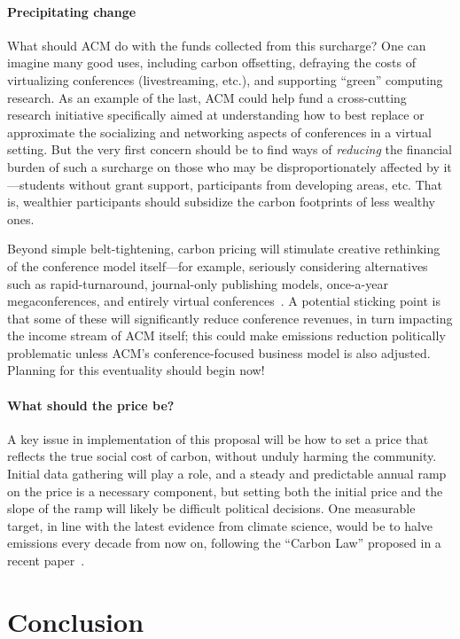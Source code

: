\documentclass[12pt]{article}
\newcommand{\bcp}[1]{\ifdraft{\bf [bcp: #1]}\fi}
\newcommand{\SECTION}{\section*}
\newcommand{\PARAGRAPH}{\paragraph*}
\begin{document}
\PARAGRAPH{Precipitating change}
What should ACM do with the funds collected from this surcharge?  One can
imagine many good uses, including carbon offsetting, defraying the costs of
virtualizing conferences (livestreaming, etc.), and supporting ``green''
computing research. As an example of the last, ACM could help fund a 
cross-cutting research initiative specifically aimed at understanding how to
best replace or approximate the socializing and networking aspects of
conferences in a virtual setting.  But the very first concern
should be to find ways of {\em reducing} the financial burden of such a
surcharge on those who may be disproportionately affected by it---students
without grant support, participants from developing areas, etc.  That is,
wealthier participants should subsidize the carbon footprints of less
wealthy ones.

Beyond simple belt-tightening, carbon pricing will stimulate creative
rethinking of the conference model 
itself---for example, seriously considering alternatives such as
rapid-turnaround, journal-only publishing models, once-a-year
megaconferences, and entirely virtual conferences~\cite{NCN}.
%
A potential sticking point is that some of these will significantly reduce
conference revenues, in turn impacting the income stream of ACM itself; this
could make emissions reduction politically problematic unless ACM's
conference-focused business model is also adjusted.  Planning for this
eventuality should begin now!

\PARAGRAPH{What should the price be?}

A key issue in implementation of this proposal will be how to set a price
that reflects the true social cost of carbon, without unduly harming the
community.
%
Initial data gathering will play a role, and a steady and predictable annual
ramp on the price is a necessary component, but setting both the initial
price and the slope of the ramp will likely be difficult political
decisions.
%
One measurable target, in line with the latest evidence from climate
science, would be to halve emissions every decade from now on, following the
``Carbon Law'' proposed in a recent paper~\cite{Rockstrom}.  \bcp{Read the
  paper and cite it!}

\SECTION{Conclusion}

\end{document}
